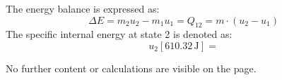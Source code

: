 The energy balance is expressed as:  
\[
\Delta E = m_2 u_2 - m_1 u_1 = Q_{12} = m \cdot (u_2 - u_1)
\]  
The specific internal energy at state 2 is denoted as:  
\[
u_2 [610.32 \, \text{J}] = 
\]  

No further content or calculations are visible on the page.